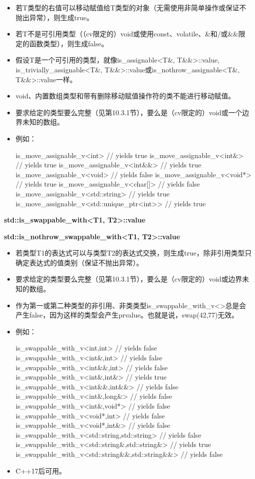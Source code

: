 \begin{itemize}
\item
若T类型的右值可以移动赋值给T类型的对象（无需使用非简单操作或保证不抛出异常），则生成true。

\item
若T不是可引用类型（（cv限定的）void或使用const、volatile、\&和/或\&\&限定的函数类型），则生成false。

\item
假设T是一个可引用的类型，就像is\_assignable<T\&, T\&\&>::value, is\_trivially\_assignable<T\&, T\&\&>::value或is\_nothrow\_assignable<T\&, T\&\&>::value一样。

\item
void、内置数组类型和带有删除移动赋值操作符的类不能进行移动赋值。

\item
要求给定的类型要么完整（见第10.3.1节），要么是（cv限定的）void或一个边界未知的数组。

\item
例如：
\begin{cpp}
is_move_assignable_v<int> // yields true
is_move_assignable_v<int&> // yields true
is_move_assignable_v<int&&> // yields true
is_move_assignable_v<void> // yields false
is_move_assignable_v<void*> // yields true
is_move_assignable_v<char[]> // yields false
is_move_assignable_v<std::string> // yields true
is_move_assignable_v<std::unique_ptr<int>> // yields true
\end{cpp}
\end{itemize}

\textbf{std::is\_swappable\_with<T1, T2>::value}

\textbf{std::is\_nothrow\_swappable\_with<T1, T2>::value}

\begin{itemize}
\item
若类型T1的表达式可以与类型T2的表达式交换，则生成true，除非引用类型只确定表达式的值类别（保证不抛出异常）。

\item
要求给定的类型要么完整（见第10.3.1节），要么是（cv限定的）void或边界未知的数组。

\item
作为第一或第二种类型的非引用、非类类型is\_swappable\_with\_v<>总是会产生false，因为这样的类型会产生prvalue。也就是说，swap(42,77)无效。

\item
例如：
\begin{cpp}
is_swappable_with_v<int,int> // yields false
is_swappable_with_v<int&,int> // yields false
is_swappable_with_v<int&&,int> // yields false
is_swappable_with_v<int&,int&> // yields true
is_swappable_with_v<int&&,int&&> // yields false
is_swappable_with_v<int&,long&> // yields false
is_swappable_with_v<int&,void*> // yields false
is_swappable_with_v<void*,int> // yields false
is_swappable_with_v<void*,int&> // yields false
is_swappable_with_v<std::string,std::string> // yields false
is_swappable_with_v<std::string&,std::string&> // yields true
is_swappable_with_v<std::string&&,std::string&&> // yields false
\end{cpp}

\item
C++17后可用。
\end{itemize}

